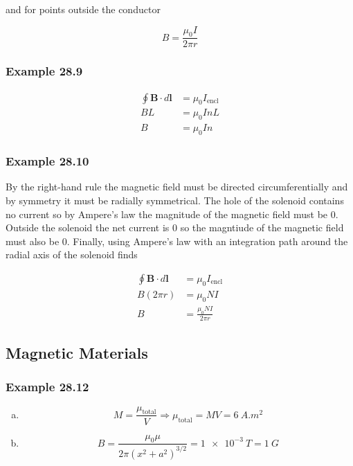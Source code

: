 \documentclass{article}
\begin{document}
and for points outside the conductor

\[B = \frac{\mu_0 I}{2 \pi r}\]

\subsubsection{Example 28.9}

\begin{align*}
  \oint \mathbf{B} \cdot d\mathbf{l} & = \mu_0 I_\textrm{encl} \\
  B L                                & = \mu_0 I n L           \\
  B                                  & = \mu_0 I n
\end{align*}

\subsubsection{Example 28.10}

By the right-hand rule the magnetic field must be directed circumferentially and by symmetry it must be radially symmetrical. The hole of the solenoid contains no current so by Ampere's law the magnitude of the magnetic field must be $0$. Outside the solenoid the net current is $0$ so the magntiude of the magnetic field must also be $0$. Finally, using Ampere's law with an integration path around the radial axis of the solenoid finds

\begin{align*}
  \oint \mathbf{B} \cdot d\mathbf{l} & = \mu_0 I_\textrm{encl}     \\
  B (2 \pi r)                        & = \mu_0 N I                 \\
  B                                  & = \frac{\mu_0 N I}{2 \pi r}
\end{align*}

\subsection{Magnetic Materials}

\subsubsection{Example 28.12}

\begin{enumerate}[(a)]
  \item \[M = \frac{\mu_\textrm{total}}{V} \Rightarrow \mu_\textrm{total} = M V = \qty{6}{A.m^2}\]

  \item \[B = \frac{\mu_0 \mu}{2 \pi \left( x^2 + a^2 \right)^{3/2}} = \qty{1e-3}{T} = \qty{1}{G}\]
\end{enumerate}
\end{document}

